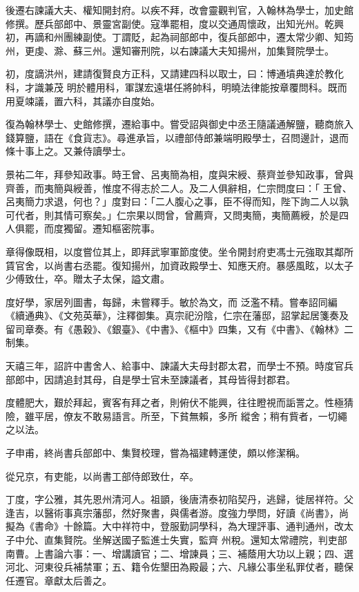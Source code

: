 \begin{pinyinscope}
 後遷右諫議大夫、權知開封府。以疾不拜，改會靈觀判官，入翰林為學士，加史館修撰。歷兵部郎中、景靈宮副使。寇準罷相，度以交通周懷政，出知光州。乾興初，再謫和州團練副使。丁謂貶，起為祠部郎中，復兵部郎中，遷太常少卿、知筠州，更虔、滁、蘇三州。還知審刑院，以右諫議大夫知揚州，加集賢院學士。



 初，度謫洪州，建請復賢良方正科，又請建四科以取士，曰：博通墳典達於教化科，才識兼茂
 明於體用科，軍謀宏遠堪任將帥科，明曉法律能按章覆問科。既而用夏竦議，置六科，其議亦自度始。



 復為翰林學士、史館修撰，遷給事中。嘗受詔與御史中丞王隨議通解鹽，聽商旅入錢算鹽，語在《食貨志》。尋進承旨，以禮部侍郎兼端明殿學士，召問邊計，退而條十事上之。又兼侍讀學士。



 景祐二年，拜參知政事。時王曾、呂夷簡為相，度與宋綬、蔡齊並參知政事，曾與齊善，而夷簡與綬善，惟度不得志於二人。及二人俱辭相，仁宗問度曰：「
 王曾、呂夷簡力求退，何也？」度對曰：「二人腹心之事，臣不得而知，陛下詢二人以孰可代者，則其情可察矣。」仁宗果以問曾，曾薦齊，又問夷簡，夷簡薦綬，於是四人俱罷，而度獨留。遷知樞密院事。



 章得像既相，以度嘗位其上，即拜武寧軍節度使。坐令開封府吏馮士元強取其鄰所賃官舍，以尚書右丞罷。復知揚州，加資政殿學士、知應天府。暴感風眩，以太子少傅致仕，卒。贈太子太保，謚文肅。



 度好學，家居列圖書，每歸，未嘗釋手。敏於為文，而
 泛濫不精。嘗奉詔同編《續通典》、《文苑英華》，注釋御集。真宗祀汾陰，仁宗在藩邸，詔掌起居箋奏及留司章奏。有《愚穀》、《銀臺》、《中書》、《樞中》四集，又有《中書》、《翰林》二制集。



 天禧三年，詔許中書舍人、給事中、諫議大夫母封郡太君，而學士不預。時度官兵部郎中，因請追封其母，自是學士官未至諫議者，其母皆得封郡君。



 度體肥大，艱於拜起，賓客有拜之者，則俯伏不能興，往往瞪視而詬詈之。性極猜險，雖平居，僚友不敢易語言。所至，下貧無賴，多所
 縱舍；稍有貲者，一切繩之以法。



 子申甫，終尚書兵部郎中、集賢校理，嘗為福建轉運使，頗以修潔稱。



 從兄京，有吏能，以尚書工部侍郎致仕，卒。



 丁度，字公雅，其先恩州清河人。祖顗，後唐清泰初陷契丹，逃歸，徙居祥符。父逢吉，以醫術事真宗藩邸，然好聚書，與儒者游。度強力學問，好讀《尚書》，尚擬為《書命》十餘篇。大中祥符中，登服勤詞學科，為大理評事、通判通州，改太子中允、直集賢院。坐解送國子監進士失實，監齊
 州稅。還知太常禮院，判吏部南曹。上書論六事：一、增講讀官；二、增諫員；三、補蔭用大功以上親；四、選河北、河東役兵補禁軍；五、籍令佐墾田為殿最；六、凡緣公事坐私罪仗者，聽保任遷官。章獻太后善之。




\end{pinyinscope}

